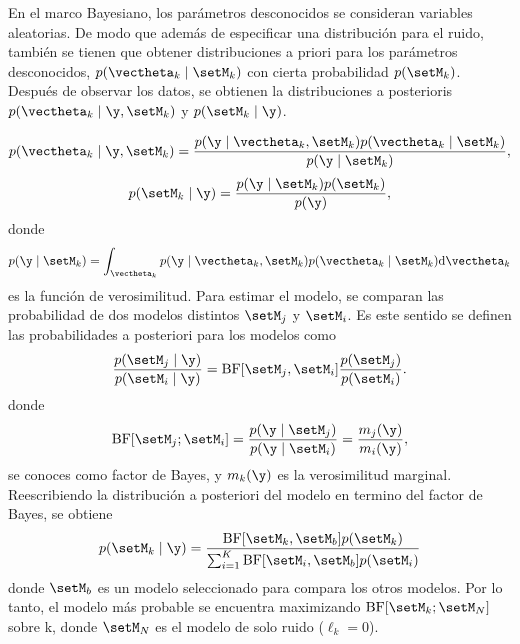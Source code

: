 	En el marco Bayesiano, los parámetros desconocidos se consideran variables aleatorias. De modo que además de especificar una distribución para el ruido, también se tienen que obtener distribuciones a priori para los parámetros desconocidos, $p(\vectheta_k\mid\setM_k)$ con cierta probabilidad $p(\setM_k)$. Después de observar los datos, se obtienen la distribuciones a posterioris $p(\vectheta_k\mid\y,\setM_k)$ y $p(\setM_k\mid\y)$.
	
	\begin{equation}
		p(\vectheta_k\mid\y,\setM_k) = \frac{p(\y\mid\vectheta_k,\setM_k)p(\vectheta_k\mid\setM_k)}{p(\y\mid\setM_k)},
		\label{eq:Bic4} 
	\end{equation}
	\begin{equation}
		p(\setM_k\mid \y) = \frac{p(\y\mid\setM_k)p(\setM_k)}{p(\y)},
		\label{eq:BIC5}
	\end{equation}
	donde 
	\begin{equation}
		p(\y\mid\setM_k) = \int_{\vectheta_k} p(\y\mid\vectheta_k,\setM_k)p(\vectheta_k\mid\setM_k)\mathrm{d}\vectheta_k
		\label{eq:BIC6}
	\end{equation}
	es la función de verosimilitud. Para estimar el modelo, se comparan las probabilidad de dos modelos distintos $\setM_j$ y $\setM_i$. Es este sentido se definen las probabilidades a posteriori para los modelos como 
	\begin{equation}
		\frac{p(\setM_j\mid \y)}{p(\setM_i\mid \y)} = \mathrm{BF}[\setM_j,\setM_i]\frac{p(\setM_j)}{p(\setM_i)}.
		\label{eq:BIC7}
	\end{equation}
	donde 
	\begin{equation}
		\mathrm{BF}[\setM_j;\setM_i] = \frac{p(\y\mid\setM_j)}{p(\y\mid\setM_i)} = \frac{m_j(\y)}{m_i(\y)},
		\label{eq:BIC8}	
	\end{equation}
	se conoces como factor de Bayes, y $m_k(\y)$ es la verosimilitud marginal. Reescribiendo la distribución a posteriori del modelo en termino del factor de Bayes, se obtiene  
	\begin{equation}
		p(\setM_k\mid\y) = \frac{\mathrm{BF}[\setM_k,\setM_b]p(\setM_k)}{\sum_{i=1}^{K}\mathrm{BF}[\setM_i,\setM_b]p(\setM_i)}
		\label{eq:BIC9}
	\end{equation}
	donde $\setM_b$ es un modelo seleccionado para compara los otros modelos. Por lo tanto, el modelo más probable se encuentra maximizando $\mathrm{BF}[\setM_k; \setM_N ]$ sobre k, donde $\setM_N$ es el modelo de solo ruido ($\ell_k=0$).
	
